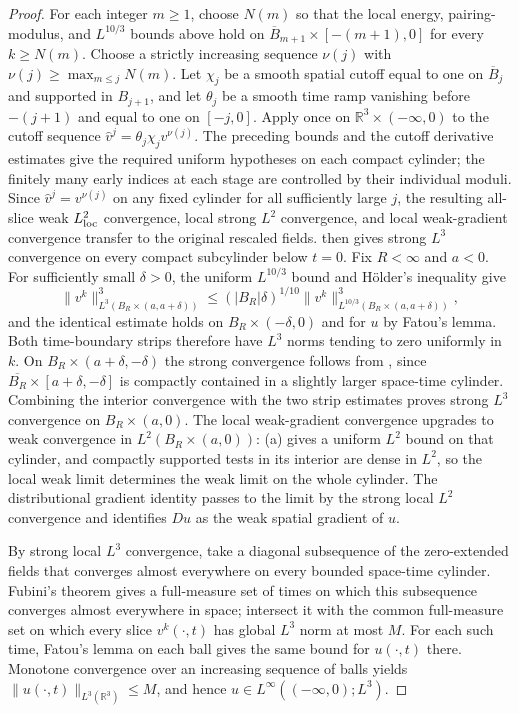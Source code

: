 \documentclass[11pt,letterpaper]{article}
\numberwithin{equation}{section}
\theoremstyle{plain}
\theoremstyle{definition}
\theoremstyle{remark}
\begin{document}
\begin{proof}
For each integer $m\ge1$, choose $N(m)$ so that the local energy, pairing-modulus, and $L^{10/3}$ bounds above hold on $\overline{B}_{m+1}\times[-(m+1),0]$ for every $k\ge N(m)$. Choose a strictly increasing sequence $\nu(j)$ with $\nu(j)\ge\max_{m\le j}N(m)$. Let $\chi_j$ be a smooth spatial cutoff equal to one on $\overline{B}_j$ and supported in $B_{j+1}$, and let $\theta_j$ be a smooth time ramp vanishing before $-(j+1)$ and equal to one on $[-j,0]$. Apply \cite[Lemma~11.1]{CKNLean} once on $\mathbb R^3\times(-\infty,0)$ to the cutoff sequence $\widehat v^j=\theta_j\chi_jv^{\nu(j)}$. The preceding bounds and the cutoff derivative estimates give the required uniform hypotheses on each compact cylinder; the finitely many early indices at each stage are controlled by their individual moduli. Since $\widehat v^j=v^{\nu(j)}$ on any fixed cylinder for all sufficiently large $j$, the resulting all-slice weak $L^2_{\rm loc}$ convergence, local strong $L^2$ convergence, and local weak-gradient convergence transfer to the original rescaled fields. \cite[Corollary~11.3]{CKNLean} then gives strong $L^3$ convergence on every compact subcylinder below $t=0$. Fix \(R<\infty\) and \(a<0\). For sufficiently small \(\delta>0\), the uniform \(L^{10/3}\) bound and H\"older's inequality give
\begin{equation*}
 \|v^k\|_{L^3(B_R\times(a,a+\delta))}^3
 \le (|B_R|\delta)^{1/10}\|v^k\|_{L^{10/3}(B_R\times(a,a+\delta))}^3,
\end{equation*}
and the identical estimate holds on \(B_R\times(-\delta,0)\) and for \(u\) by Fatou's lemma. Both time-boundary strips therefore have \(L^3\) norms tending to zero uniformly in \(k\). On \(B_R\times(a+\delta,-\delta)\) the strong convergence follows from \cite[Corollary~11.3]{CKNLean}, since \(\overline{B_R}\times[a+\delta,-\delta]\) is compactly contained in a slightly larger space-time cylinder. Combining the interior convergence with the two strip estimates proves strong \(L^3\) convergence on \(B_R\times(a,0)\). The local weak-gradient convergence upgrades to weak convergence in \(L^2(B_R\times(a,0))\): (a) gives a uniform \(L^2\) bound on that cylinder, and compactly supported tests in its interior are dense in \(L^2\), so the local weak limit determines the weak limit on the whole cylinder. The distributional gradient identity passes to the limit by the strong local \(L^2\) convergence and identifies \(Du\) as the weak spatial gradient of \(u\).

By strong local $L^3$ convergence, take a diagonal subsequence of the zero-extended fields that converges almost everywhere on every bounded space-time cylinder. Fubini's theorem gives a full-measure set of times on which this subsequence converges almost everywhere in space; intersect it with the common full-measure set on which every slice $v^k(\cdot,t)$ has global $L^3$ norm at most $M$. For each such time, Fatou's lemma on each ball gives the same bound for $u(\cdot,t)$ there. Monotone convergence over an increasing sequence of balls yields $\|u(\cdot,t)\|_{L^3(\mathbb R^3)}\le M$, and hence $u\in L^\infty((-\infty,0);L^3)$.


\end{proof}
\end{document}

